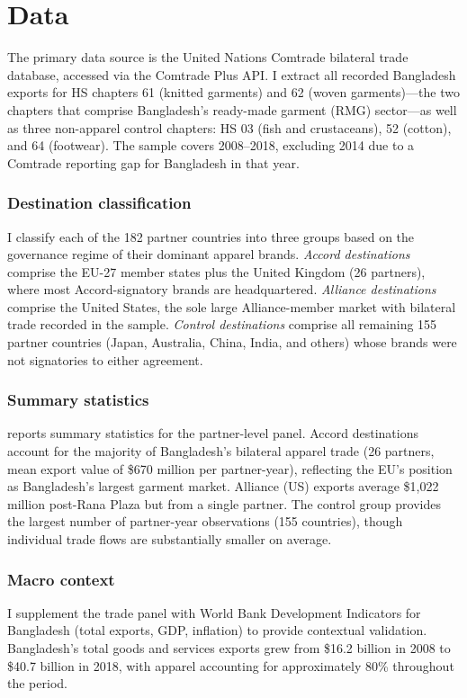 \documentclass[12pt]{article}
\begin{document}
\section{Data}
\label{sec:data}

The primary data source is the United Nations Comtrade bilateral trade database, accessed via the Comtrade Plus API. I extract all recorded Bangladesh exports for HS chapters 61 (knitted garments) and 62 (woven garments)---the two chapters that comprise Bangladesh's ready-made garment (RMG) sector---as well as three non-apparel control chapters: HS 03 (fish and crustaceans), 52 (cotton), and 64 (footwear). The sample covers 2008--2018, excluding 2014 due to a Comtrade reporting gap for Bangladesh in that year.

\subsubsection*{Destination classification} I classify each of the 182 partner countries into three groups based on the governance regime of their dominant apparel brands. \textit{Accord destinations} comprise the EU-27 member states plus the United Kingdom (26 partners), where most Accord-signatory brands are headquartered. \textit{Alliance destinations} comprise the United States, the sole large Alliance-member market with bilateral trade recorded in the sample. \textit{Control destinations} comprise all remaining 155 partner countries (Japan, Australia, China, India, and others) whose brands were not signatories to either agreement.

\subsubsection*{Summary statistics}  reports summary statistics for the partner-level panel. Accord destinations account for the majority of Bangladesh's bilateral apparel trade (26 partners, mean export value of \$670 million per partner-year), reflecting the EU's position as Bangladesh's largest garment market. Alliance (US) exports average \$1,022 million post-Rana Plaza but from a single partner. The control group provides the largest number of partner-year observations (155 countries), though individual trade flows are substantially smaller on average.



\subsubsection*{Macro context} I supplement the trade panel with World Bank Development Indicators for Bangladesh (total exports, GDP, inflation) to provide contextual validation. Bangladesh's total goods and services exports grew from \$16.2 billion in 2008 to \$40.7 billion in 2018, with apparel accounting for approximately 80\% throughout the period.
\end{document}
